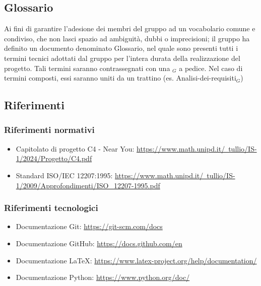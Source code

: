 \documentclass[10pt]{article}
\begin{document}
\begin{justify}
    \subsection{Glossario}
    Ai fini di garantire l'adesione dei membri del gruppo ad un vocabolario comune e condiviso, che non lasci spazio ad ambiguità, dubbi o imprecisioni; il gruppo ha definito un documento denominato Glossario, nel quale sono presenti tutti i termini tecnici adottati dal gruppo per l'intera durata della realizzazione del progetto. Tali termini saranno contrassegnati con una $_G$ a pedice. Nel caso di termini composti, essi saranno uniti da un trattino (es. Analisi-dei-requisiti$_G$)

    \subsection{Riferimenti}
        \subsubsection{Riferimenti normativi}
        \begin{itemize}
            \item Capitolato di progetto C4 - Near You: \href{https://www.math.unipd.it/~tullio/IS-1/2024/Progetto/C4.pdf}{https://www.math.unipd.it/~tullio/IS-1/2024/Progetto/C4.pdf}
            \item Standard ISO/IEC 12207:1995: \href{https://www.math.unipd.it/~tullio/IS-1/2009/Approfondimenti/ISO_12207-1995.pdf}{https://www.math.unipd.it/~tullio/IS-1/2009/Approfondimenti/ISO\_12207-1995.pdf}
        \end{itemize}
        \subsubsection{Riferimenti tecnologici}
        \begin{itemize}
            \item Documentazione Git: \href{https://git-scm.com/docs}{https://git-scm.com/docs}
            \item Documentazione GitHub: \href{https://docs.github.com/en}{https://docs.github.com/en}
            \item Documentazione \LaTeX: \href{https://www.latex-project.org/help/documentation/}{https://www.latex-project.org/help/documentation/}
            \item Documentazione Python: \href{https://www.python.org/doc/}{https://www.python.org/doc/}
        \end{itemize}

\end{justify}
\end{document}
